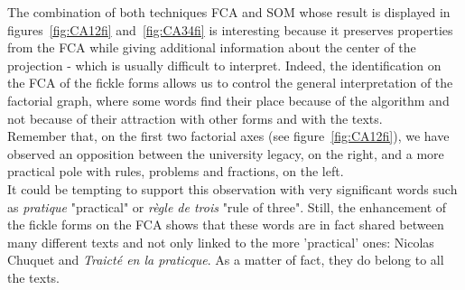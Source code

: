 \documentclass[preprint]{elsarticle}
\begin{document}
%
%
%
%

The combination of both techniques FCA and SOM whose result is displayed in figures~\ref{fig:CA12fi} and~\ref{fig:CA34fi} is interesting because it preserves properties from the FCA while giving additional information about the center of the projection - which is usually difficult to interpret. Indeed, the identification on the FCA of the fickle forms allows us to control the general interpretation of the factorial graph, where some words find their place because of the algorithm and not because of their attraction with other forms and with the texts.\\

Remember that, on the first two factorial axes (see figure~\ref{fig:CA12fi}), we have observed an opposition between the university legacy, on the right, and a more practical pole with rules, problems and fractions, on the left.\\

It could be tempting to support this observation with very significant words such as \textit{pratique} "practical" or \textit{règle de trois} "rule of three". Still, the enhancement of the fickle forms on the FCA shows that these words are in fact shared between many different texts and not only linked to the more 'practical' ones: Nicolas Chuquet and \textit{Traict\'e en la praticque}. As a matter of fact, they do belong to all the texts.\\ %
\end{document}
